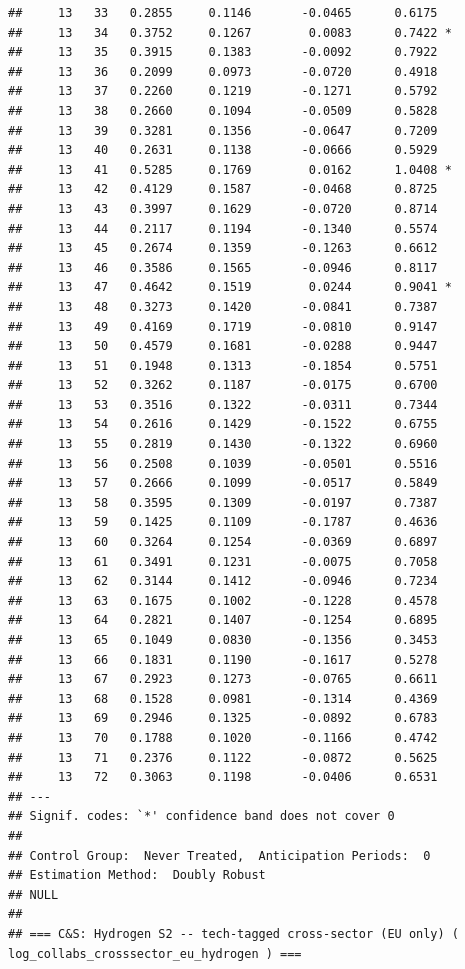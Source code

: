 \documentclass[
]{article}
\begin{document}
\begin{verbatim}
##     13   33   0.2855     0.1146       -0.0465      0.6175  
##     13   34   0.3752     0.1267        0.0083      0.7422 *
##     13   35   0.3915     0.1383       -0.0092      0.7922  
##     13   36   0.2099     0.0973       -0.0720      0.4918  
##     13   37   0.2260     0.1219       -0.1271      0.5792  
##     13   38   0.2660     0.1094       -0.0509      0.5828  
##     13   39   0.3281     0.1356       -0.0647      0.7209  
##     13   40   0.2631     0.1138       -0.0666      0.5929  
##     13   41   0.5285     0.1769        0.0162      1.0408 *
##     13   42   0.4129     0.1587       -0.0468      0.8725  
##     13   43   0.3997     0.1629       -0.0720      0.8714  
##     13   44   0.2117     0.1194       -0.1340      0.5574  
##     13   45   0.2674     0.1359       -0.1263      0.6612  
##     13   46   0.3586     0.1565       -0.0946      0.8117  
##     13   47   0.4642     0.1519        0.0244      0.9041 *
##     13   48   0.3273     0.1420       -0.0841      0.7387  
##     13   49   0.4169     0.1719       -0.0810      0.9147  
##     13   50   0.4579     0.1681       -0.0288      0.9447  
##     13   51   0.1948     0.1313       -0.1854      0.5751  
##     13   52   0.3262     0.1187       -0.0175      0.6700  
##     13   53   0.3516     0.1322       -0.0311      0.7344  
##     13   54   0.2616     0.1429       -0.1522      0.6755  
##     13   55   0.2819     0.1430       -0.1322      0.6960  
##     13   56   0.2508     0.1039       -0.0501      0.5516  
##     13   57   0.2666     0.1099       -0.0517      0.5849  
##     13   58   0.3595     0.1309       -0.0197      0.7387  
##     13   59   0.1425     0.1109       -0.1787      0.4636  
##     13   60   0.3264     0.1254       -0.0369      0.6897  
##     13   61   0.3491     0.1231       -0.0075      0.7058  
##     13   62   0.3144     0.1412       -0.0946      0.7234  
##     13   63   0.1675     0.1002       -0.1228      0.4578  
##     13   64   0.2821     0.1407       -0.1254      0.6895  
##     13   65   0.1049     0.0830       -0.1356      0.3453  
##     13   66   0.1831     0.1190       -0.1617      0.5278  
##     13   67   0.2923     0.1273       -0.0765      0.6611  
##     13   68   0.1528     0.0981       -0.1314      0.4369  
##     13   69   0.2946     0.1325       -0.0892      0.6783  
##     13   70   0.1788     0.1020       -0.1166      0.4742  
##     13   71   0.2376     0.1122       -0.0872      0.5625  
##     13   72   0.3063     0.1198       -0.0406      0.6531  
## ---
## Signif. codes: `*' confidence band does not cover 0
## 
## Control Group:  Never Treated,  Anticipation Periods:  0
## Estimation Method:  Doubly Robust
## NULL
## 
## === C&S: Hydrogen S2 -- tech-tagged cross-sector (EU only) ( log_collabs_crosssector_eu_hydrogen ) ===
\end{verbatim}
\end{document}
